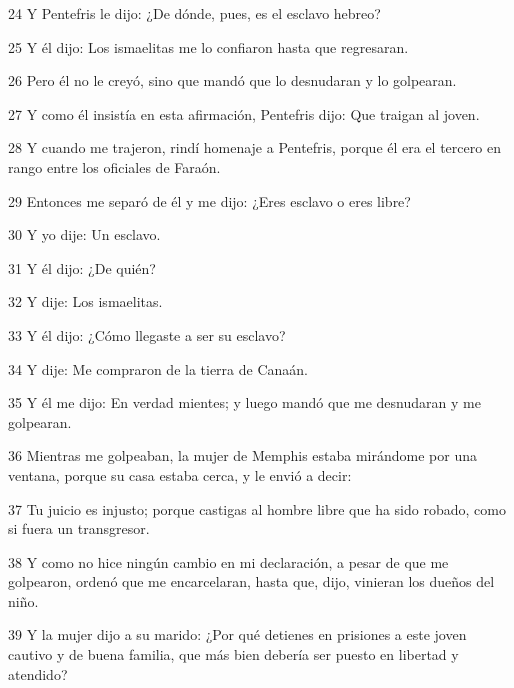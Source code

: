 \par 24 Y Pentefris le dijo: ¿De dónde, pues, es el esclavo hebreo?

\par 25 Y él dijo: Los ismaelitas me lo confiaron hasta que regresaran.

\par 26 Pero él no le creyó, sino que mandó que lo desnudaran y lo golpearan.

\par 27 Y como él insistía en esta afirmación, Pentefris dijo: Que traigan al joven.

\par 28 Y cuando me trajeron, rindí homenaje a Pentefris, porque él era el tercero en rango entre los oficiales de Faraón.

\par 29 Entonces me separó de él y me dijo: ¿Eres esclavo o eres libre?

\par 30 Y yo dije: Un esclavo.

\par 31 Y él dijo: ¿De quién?

\par 32 Y dije: Los ismaelitas.

\par 33 Y él dijo: ¿Cómo llegaste a ser su esclavo?

\par 34 Y dije: Me compraron de la tierra de Canaán.

\par 35 Y él me dijo: En verdad mientes; y luego mandó que me desnudaran y me golpearan.

\par 36 Mientras me golpeaban, la mujer de Memphis estaba mirándome por una ventana, porque su casa estaba cerca, y le envió a decir:

\par 37 Tu juicio es injusto; porque castigas al hombre libre que ha sido robado, como si fuera un transgresor.

\par 38 Y como no hice ningún cambio en mi declaración, a pesar de que me golpearon, ordenó que me encarcelaran, hasta que, dijo, vinieran los dueños del niño.

\par 39 Y la mujer dijo a su marido: ¿Por qué detienes en prisiones a este joven cautivo y de buena familia, que más bien debería ser puesto en libertad y atendido?

